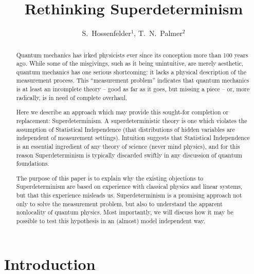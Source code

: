 \documentclass[12pt]{article}
\begin{document}
\title{Rethinking Superdeterminism}
\author{S.~Hossenfelder$^{1}$, T.~N.~Palmer$^{2}$}

\date{}
\maketitle
\vspace*{-1cm}


\begin{abstract}
Quantum mechanics has irked physicists ever since its conception more than 100 years ago. 
While some of the misgivings, such as it being unintuitive, are merely aesthetic, 
quantum mechanics has one serious shortcoming: it lacks a physical description of the
measurement process. This ``measurement problem''  indicates that quantum 
mechanics is at least an incomplete theory -- good as far as it goes, but missing a piece -- or, more radically, is in need of complete overhaul.

Here we describe an approach which may provide this sought-for completion or replacement: Superdeterminism. A superdeterministic theory is one which violates the assumption of Statistical Independence (that distributions of hidden variables are independent of measurement settings). Intuition suggests that Statistical Independence is an essential ingredient of any theory of science (never mind physics), and for this reason Superdeterminism is typically discarded swiftly in any discussion of quantum foundations. 

The purpose of this paper is to explain why the existing objections to Superdeterminism are based on experience with classical physics and linear systems, but that this experience
misleads us. Superdeterminism is a promising approach not only to solve the measurement problem, but also to understand the apparent 
nonlocality of quantum physics. Most importantly, we will discuss how it may be possible to test this hypothesis in an (almost) model independent way.

\end{abstract}

\newpage

\section{Introduction}
\end{document}
